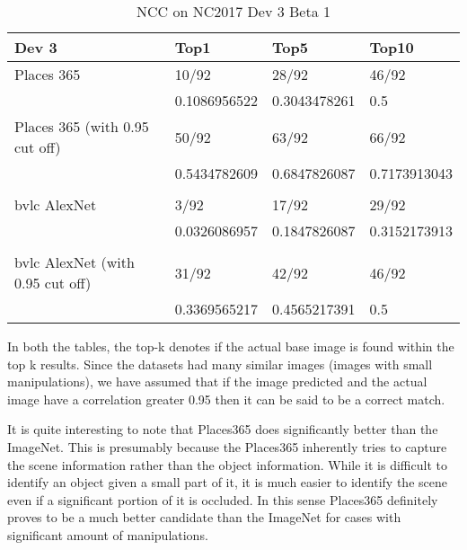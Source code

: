 \documentclass{article}
\begin{document}
\begin{table}[H]
\centering
\caption{NCC on NC2017 Dev 3 Beta 1}
\label{sg_dev3}
\begin{tabular}{|l|l|l|l|}
\hline
Dev 3                          & Top1         & Top5         & Top10        \\ \hline
Places 365                     & 10/92        & 28/92        & 46/92        \\ \hline
                               & 0.1086956522 & 0.3043478261 & 0.5          \\ \hline
Places 365 (with 0.95 cut off) & 50/92        & 63/92        & 66/92        \\ \hline
                               & 0.5434782609 & 0.6847826087 & 0.7173913043 \\ \hline
                               &              &              &              \\ \hline
bvlc AlexNet                           & 3/92         & 17/92        & 29/92        \\ \hline
                               & 0.0326086957 & 0.1847826087 & 0.3152173913 \\ \hline
                               &              &              &              \\ \hline
bvlc AlexNet (with 0.95 cut off)       & 31/92        & 42/92        & 46/92        \\ \hline
                               & 0.3369565217 & 0.4565217391 & 0.5          \\ \hline
\end{tabular}
\end{table}

In both the tables, the top-k denotes if the actual base image is found within the top k results. Since the datasets had many similar images (images with small manipulations), we have assumed that if the image predicted and the actual image have a correlation greater 0.95 then it can be said to be a correct match.

It is quite interesting to note that Places365 does significantly better than the ImageNet. This is presumably because the Places365 inherently tries to capture the scene information rather than the object information. While it is difficult to identify an object given a small part of it, it is much easier to identify the scene even if a significant portion of it is occluded. In this sense Places365 definitely proves to be a much better candidate than the ImageNet for cases with significant amount of manipulations.
\end{document}
